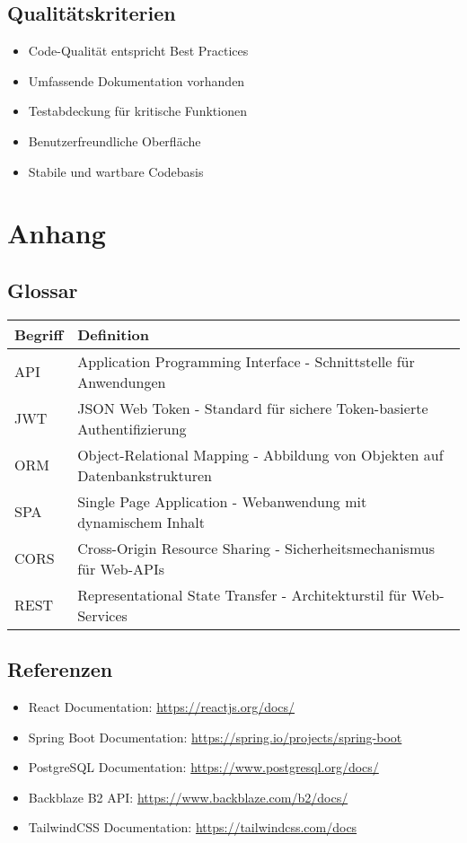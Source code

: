 \documentclass[a4paper,12pt]{article}
\begin{document}
\subsection{Qualitätskriterien}
\begin{itemize}
    \item Code-Qualität entspricht Best Practices
    \item Umfassende Dokumentation vorhanden
    \item Testabdeckung für kritische Funktionen
    \item Benutzerfreundliche Oberfläche
    \item Stabile und wartbare Codebasis
\end{itemize}

\section{Anhang}

\subsection{Glossar}
\begin{longtable}{|p{}|p{}|}
\hline
\textbf{Begriff} & \textbf{Definition} \\
\hline
API & Application Programming Interface - Schnittstelle für Anwendungen \\
\hline
JWT & JSON Web Token - Standard für sichere Token-basierte Authentifizierung \\
\hline
ORM & Object-Relational Mapping - Abbildung von Objekten auf Datenbankstrukturen \\
\hline
SPA & Single Page Application - Webanwendung mit dynamischem Inhalt \\
\hline
CORS & Cross-Origin Resource Sharing - Sicherheitsmechanismus für Web-APIs \\
\hline
REST & Representational State Transfer - Architekturstil für Web-Services \\
\hline
\end{longtable}

\subsection{Referenzen}
\begin{itemize}
    \item React Documentation: \url{https://reactjs.org/docs/}
    \item Spring Boot Documentation: \url{https://spring.io/projects/spring-boot}
    \item PostgreSQL Documentation: \url{https://www.postgresql.org/docs/}
    \item Backblaze B2 API: \url{https://www.backblaze.com/b2/docs/}
    \item TailwindCSS Documentation: \url{https://tailwindcss.com/docs}
\end{itemize}
\end{document}
